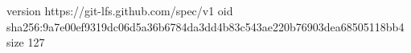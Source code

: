 version https://git-lfs.github.com/spec/v1
oid sha256:9a7e00ef9319dc06d5a36b6784da3dd4b83c543ae220b76903dea68505118bb4
size 127

